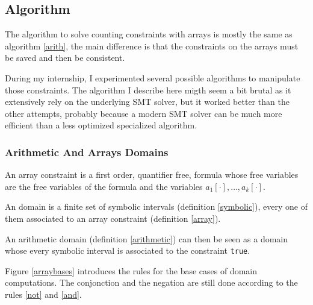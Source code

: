 \documentclass[]{article}
\begin{document}
\subsection{Algorithm}\label{algorithm}

The algorithm to solve counting constraints with arrays is mostly the
same as algorithm \ref{arith}, the main difference is that the
constraints on the arrays must be saved and then be consistent.

During my internship, I experimented several possible algorithms to
manipulate those constraints. The algorithm I describe here migth seem a
bit brutal as it extensively rely on the underlying SMT solver, but it
worked better than the other attempts, probably because a modern SMT
solver can be much more efficient than a less optimized specialized
algorithm.

\subsubsection{Arithmetic And Arrays
Domains}\label{arithmetic-and-arrays-domains}

\begin{definition}

An array constraint is a first order, quantifier free, formula whose
free variables are the free variables of the formula and the variables
$a_1[\cdot], \ldots, a_k[\cdot]$.

\label{array}

\end{definition}

\vspace{3mm}

\begin{definition}[Domain]

An domain is a finite set of symbolic intervals (definition
\ref{symbolic}), every one of them associated to an array constraint
(definition \ref{array}).

\label{domain}

\end{definition}

An arithmetic domain (definition \ref{arithmetic}) can then be seen as a
domain whose every symbolic interval is associated to the constraint
\texttt{true}.

Figure \ref{arraybases} introduces the rules for the base cases of
domain computations. The conjonction and the negation are still done
according to the rules \ref{not} and \ref{and}.
\end{document}
